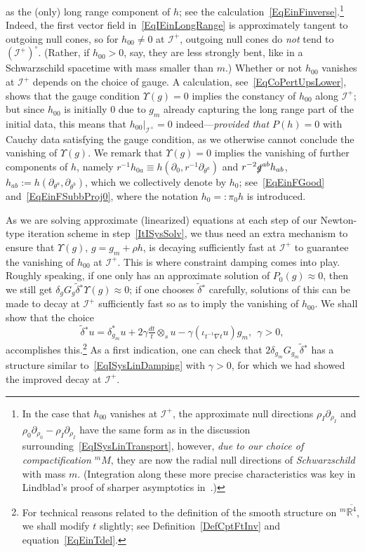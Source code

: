 \documentclass[reqno,11pt,letterpaper]{amsart}
\numberwithin{equation}{section}
\numberwithin{figure}{section}
\theoremstyle{definition}
\theoremstyle{remark}
\newcommand{\ms}{\mathscr}
\newcommand{\scri}{\ms I}
\newcommand{\R}{\mathbb{R}}
\newcommand{\slg}{\slashed{g}{}}
\newcommand{\Ups}{\Upsilon}
\newcommand{\ol}{\overline}
\newcommand{\pa}{\partial}
\newcommand{\wt}{\widetilde}
\newcommand{\tdel}{\wt{\delta}{}}
\begin{document}
as the (only) long range component of $h$; see the calculation~\eqref{EqEinFinverse}.\footnote{In the case that $h_{0 0}$ vanishes at $\scri^+$, the approximate null directions $\rho_I\pa_{\rho_I}$ and $\rho_0\pa_{\rho_0}-\rho_I\pa_{\rho_I}$ have the same form as in the discussion surrounding~\eqref{EqISysLinTransport}, however, \emph{due to our choice of compactification ${}^m\!M$}, they are now the radial null directions of \emph{Schwarzschild} with mass $m$. (Integration along these more precise characteristics was key in Lindblad's proof of sharper asymptotics in~\cite{LindbladAsymptotics}.)} Indeed, the first vector field in~\eqref{EqIEinLongRange} is approximately tangent to outgoing null cones, so for $h_{0 0}\neq 0$ at $\scri^+$, outgoing null cones do \emph{not} tend to $(\scri^+)^\circ$. (Rather, if $h_{0 0}>0$, say, they are less strongly bent, like in a Schwarzschild spacetime with mass smaller than $m$.) Whether or not $h_{0 0}$ vanishes at $\scri^+$ depends on the choice of gauge. A calculation, see~\eqref{EqCoPertUpsLower}, shows that the gauge condition $\Ups(g)=0$ implies the constancy of $h_{0 0}$ along $\scri^+$; but since $h_{0 0}$ is initially $0$ due to $g_m$ already capturing the long range part of the initial data, this means that $h_{0 0}|_{\scri^+}=0$ indeed---\emph{provided that $P(h)=0$} with Cauchy data satisfying the gauge condition, as we otherwise cannot conclude the vanishing of $\Ups(g)$. We remark that $\Ups(g)=0$ implies the vanishing of further components of $h$, namely $r^{-1}h_{0 a}\equiv h(\pa_0,r^{-1}\pa_{\theta^a})$ and $r^{-2}\slg^{a b}h_{a b}$, $h_{a b}:=h(\pa_{\theta^a},\pa_{\theta^b})$, which we collectively denote by $h_0$; see~\eqref{EqEinFGood} and~\eqref{EqEinFSubbProj0}, where the notation $h_0=:\pi_0 h$ is introduced.

As we are solving approximate (linearized) equations at each step of our Newton-type iteration scheme in step~\ref{ItISysSolv}, we thus need an extra mechanism to ensure that $\Ups(g)$, $g=g_m+\rho h$, is decaying sufficiently fast at $\scri^+$ to guarantee the vanishing of $h_{0 0}$ at $\scri^+$. This is where constraint damping comes into play. Roughly speaking, if one only has an approximate solution of $P_0(g)\approx 0$, then we still get $\delta_g G_g\tdel^*\Ups(g)\approx 0$; if one chooses $\tdel^*$ carefully, solutions of this can be made to decay at $\scri^+$ sufficiently fast so as to imply the vanishing of $h_{0 0}$. We shall show that the choice
\[
  \tdel^* u = \delta_{g_m}^*u + 2\gamma\tfrac{d t}{t}\otimes_s u - \gamma(\iota_{t^{-1}\nabla t}u)g_m,\ \ 
  \gamma>0,
\]
accomplishes this.\footnote{For technical reasons related to the definition of the smooth structure on ${}^m\ol{\R^4}$, we shall modify $t$ slightly; see Definition~\ref{DefCptFtInv} and equation~\eqref{EqEinTdel}.} As a first indication, one can check that $2\delta_{g_m}G_{g_m}\tdel^*$ has a structure similar to~\eqref{EqISysLinDamping} with $\gamma>0$, for which we had showed the improved decay at $\scri^+$.
\end{document}
